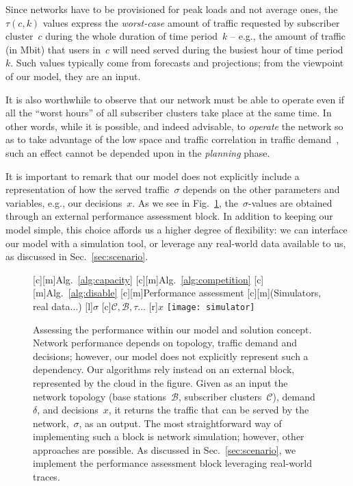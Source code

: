 \documentclass[10pt,journal,cspaper,compsoc]{IEEEtran}
\newcommand{\Fig}[1]{Fig.~\ref{fig:#1}}
\newcommand{\Sec}[1]{Sec.~\ref{sec:#1}}
\newcommand{\Alg}[1]{Alg.~\ref{alg:#1}}
\newcommand{\Bc}{\mathcal{B}}
\newcommand{\Cc}{\mathcal{C}}
\begin{document}
Since networks have to be provisioned for peak loads and not average ones, the~$\tau(c,k)$ values express the
{\em worst-case} amount of traffic requested by subscriber cluster~$c$ during the whole duration of time period~$k$ --
e.g., the amount of traffic (in Mbit) that users in~$c$ will need served during the busiest hour of
time period~$k$. Such values typically come from forecasts and projections; from the viewpoint of our model,
they are an input.

It is also worthwhile to observe that our network must be able to operate even if all the ``worst hours'' of all
subscriber clusters take place at the same time. In other words, while it is possible, and indeed advisable,
to {\em operate} the network so as to take advantage of the low space and traffic correlation in traffic
demand~\cite{difrancesco2014}, such an effect cannot be depended upon in the {\em planning} phase.

It is important to remark that our model does not explicitly include a representation of how the served traffic~$\sigma$ depends
on the other parameters and variables, e.g., our decisions~$x$.
As we see in \Fig{simulator}, the~$\sigma$-values are obtained through an external performance assessment block.
In addition to keeping our model simple, this
choice affords us a higher degree of flexibility: we can interface our model with a simulation tool, or leverage any real-world data available to us, as discussed in \Sec{scenario}.
\begin{figure}[t!]
[c][m]{\textsf{\Alg{capacity}}}
[c][m]{\textsf{\Alg{competition}}}
[c][m]{\textsf{\Alg{disable}}}
[c][m]{\textsf{Performance assessment}}
[c][m]{\footnotesize{\textsf{(Simulators, real data...)}}}
[l]{\footnotesize{$\sigma$}}
[c]{\footnotesize{$\Cc,\Bc,\tau\dots$}}
[r]{\footnotesize{$x$}}
\centering
	\texttt{[image: simulator]}
	\caption{
	Assessing the performance within our model and solution concept.
	Network performance depends on topology, traffic demand
	and decisions; however, our model does not explicitly represent
	such a dependency.
	Our algorithms rely instead on an external block, represented by the cloud in the figure. Given as an input the network topology
	(base stations~$\Bc$, subscriber clusters~$\Cc$), demand~$\delta$, and decisions~$x$, it returns
	the traffic that can be served by the network,~$\sigma$, as an output.
	The most straightforward way of implementing such a block is network simulation;
	however, other approaches are possible. As discussed in \Sec{scenario}, we implement
	the performance assessment block leveraging real-world traces.
	}
	\label{fig:simulator}
\end{figure}
\end{document}
